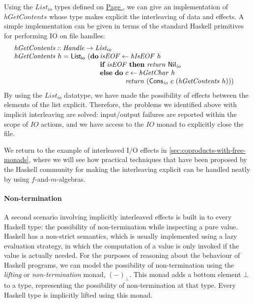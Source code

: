 \documentclass{jfp1}
\newcommand{\kw}[1]{\textbf{#1}}
\begin{document}
Using the $\mathit{List_{io}}$ types defined on
\hyperref[defn:listio]{Page \pageref*{defn:listio}}, we can give an
implementation of $\mathit{hGetContents}$ whose type makes explicit
the interleaving of data and effects. A simple implementation can be
given in terms of the standard Haskell primitives for performing IO on
file handles:
\begin{displaymath}
  \begin{array}{l}
  \mathit{hGetContents} :: \mathit{Handle} \to \mathit{List_{io}} \\
  \begin{array}{@{}l@{\hspace{0.2em}}l}
    \mathit{hGetContents}~h = \mathsf{List_{io}}~(\kw{do} & \mathit{isEOF} \leftarrow \mathit{hIsEOF}~h \\
    & \kw{if}~\mathit{isEOF}~\kw{then}~\mathit{return}~\mathsf{Nil}_{\mathit{io}} \\
    & \kw{else}~\kw{do}~
    \begin{array}[t]{@{}l}
      c \leftarrow \mathit{hGetChar}~h \\
      \mathit{return}~(\mathsf{Cons}_{\mathit{io}}~c~(\mathit{hGetContents}~h)))
    \end{array}
  \end{array}
\end{array}
\end{displaymath}
By using the $\mathit{List_{io}}$ datatype, we have made the
possibility of effects between the elements of the list
explicit. Therefore, the problems we identified above with implicit
interleaving are solved: input/output failures are reported within the
scope of $\mathit{IO}$ actions, and we have access to the
$\mathit{IO}$ monad to explicitly close the file.

We return to the example of interleaved I/O effects in
\autoref{sec:coproducts-with-free-monads}, where we will see how
practical techniques that have been proposed by the Haskell community
for making the interleaving explicit can be handled neatly by using
$f$-and-$m$-algebras.

\paragraph{Non-termination} A second scenario involving implicitly
interleaved effects is built in to every Haskell type: the possibility
of non-termination while inspecting a pure value. Haskell has a
non-strict semantics, which is usually implemented using a lazy
evaluation strategy, in which the computation of a value is only
invoked if the value is actually needed. For the purposes of reasoning
about the behaviour of Haskell programs, we can model the possibility
of non-termination using the \emph{lifting} or \emph{non-termination}
monad, $(-)_\bot$. This monad adds a bottom element $\bot$ to a type,
representing the possibility of non-termination at that type.  Every
Haskell type is implicitly lifted using this monad.
\end{document}
